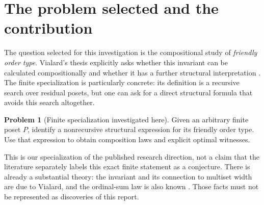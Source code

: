 \documentclass[11pt,letterpaper]{article}
\theoremstyle{definition}
\newtheorem{problem}[problem]{Problem}
\theoremstyle{remark}
\begin{document}
\begin{abstract}
Friendly order type is the rank of the tree of bad sequences whose successive
choices retain an incomparable witness in the current residual. It was
introduced to compute the ordinal width of the multiset ordering. We prove
that for a finite poset it is simply the rank of the graphic matroid of the
incomparability graph: the number of vertices minus the number of components.
The key lemma produces a maximal non-cut vertex while preserving any specified
minimal vertex. It yields optimal sequences, spanning-forest certificates, and
a classification of all maximum friendly subsets. Further consequences include
closed formulas for finite Cartesian products and arbitrary nonempty finite
lexicographic substitutions, an exact generating function for the distribution
on naturally labelled posets, and a transfinite summation theorem. In particular,
well-ordered sums of two-element antichains realize every ordinal as a friendly
order type, even though all countably infinite examples have isomorphic
incomparability graphs. Computations compare the defining recursion with the
formula on 101,660 naturally labelled posets through size seven, and test
additional product, substitution, and prescribed-root cases.
\end{abstract}
\setcounter{tocdepth}{1}
\tableofcontents
\newpage

\section{The problem selected and the contribution}
\label{sec:problem}
The question selected for this investigation is the compositional study of
\emph{friendly order type}. Vialard's thesis explicitly asks whether this
invariant can be calculated compositionally and whether it has a further
structural interpretation \cite[Conclusion, p.~109]{VialardThesis}.
The finite specialization is particularly concrete: its definition is a
recursive search over residual posets, but one can ask for a direct structural
formula that avoids this search altogether.

\begin{problem}[Finite specialization investigated here]
Given an arbitrary finite poset $P$, identify a nonrecursive structural
expression for its friendly order type. Use that expression to obtain
composition laws and explicit optimal witnesses.
\end{problem}

This is our specialization of the published research direction, not a claim
that the literature separately labels this exact finite statement as a
conjecture. There is already a substantial theory: the invariant and its
connection to multiset width are due to Vialard, and the ordinal-sum law is
also known \cite[Definition~3.3, Theorem~3.4, Proposition~4.1(1)]{VialardMFCS}.
Those facts must not be represented as discoveries of this report.
\end{document}
